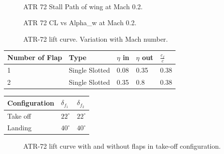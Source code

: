 \noindent \\

\begin{figure}[H]
\centering

\caption{ATR 72 Stall Path of wing at Mach 0.2.}
\label{fig:stallATR}
\end{figure}


\begin{figure}[H]
\centering

\caption{ATR 72 CL vs Alpha_w at Mach 0.2.}
\label{fig:clATR}
\end{figure}

\begin{figure}[H]
\centering

\caption{ATR-72 lift curve. Variation with Mach number.}
\label{fig:clATR}
\end{figure}




\begin{center}
	\begin{tabular}{| l | l | l | l | l |}
	\hline
		 Number of Flap & Type &  $\eta$ in &  $\eta$ out &   $\frac{c_{f}}{c} $   \\ \hline
		1  & Single Slotted& 0.08  & 0.35 &  0.38 \\ \hline
		2  & Single Slotted& 0.35 & 0.8 & 0.38 \\ \hline
		\hline
	\end{tabular}
\end{center}


\begin{center}
	\begin{tabular}{ | l | l | l |}
		\hline
		Configuration &  $\delta_{f_1}$ & $\delta_{f_2}$  \\ \hline
		Take off &  $22^{\circ}$ &  $22^{\circ}$\\ \hline
		Landing  &  $40^{\circ}$ &  $40^{\circ}$\\ \hline
		\hline
	\end{tabular}
\end{center}



\begin{figure}[H]
\centering

\caption{ATR-72 lift curve with and without flaps in take-off configuration.}
\label{fig:clATR}
\end{figure}



